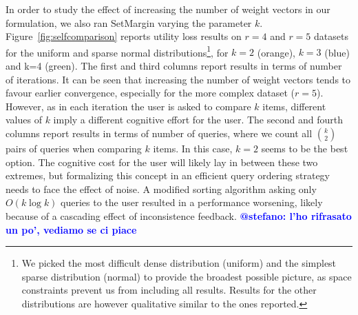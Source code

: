 \documentclass{article}
\renewcommand\[{\begin{equation}}
\renewcommand\]{\end{equation}}
\newcommand{\vecvar}[1]{\ensuremath{\boldsymbol{#1}}}
\newcommand{\vx}{\vecvar{x}}
\newcommand{\andrea}[1]{{\bf \textcolor{blue}{{\fbox{Andrea:} #1}}}}
\newcommand{\stefano}[1]{{\bf \textcolor{green}{{\fbox{Stefano:} #1}}}}
\begin{document}
In order to study the effect of increasing the number of weight
vectors in our formulation, we also ran {\sc SetMargin} varying the
parameter $k$. Figure~\ref{fig:selfcomparison} reports utility loss
results on $r=4$ and $r=5$ datasets for the uniform and sparse normal
distributions\footnote{We picked the most difficult dense distribution
  (uniform) and the simplest sparse distribution (normal) to provide
  the broadest possible picture, as space constraints prevent us from
  including all results. Results for the other distributions are
  however qualitative similar to the ones reported.}, for $k=2$
(orange), $k=3$ (blue) and k=4 (green). The first and third columns
report results in terms of number of iterations. It can be seen that
increasing the number of weight vectors tends to favour earlier
convergence, especially for the more complex dataset ($r=5$). However,
as in each iteration the user is asked to compare $k$ items, different
values of $k$ imply a different cognitive effort for the user. The
second and fourth columns report results in terms of number of
queries, where we count all $k \choose 2$ pairs of queries when
comparing $k$ items. In this case, $k=2$ seems to be the best
option. The cognitive cost for the user will likely lay in between
these two extremes, but formalizing this concept in an efficient query
ordering strategy needs to face the effect of noise.  A modified
sorting algorithm asking only $O(k\log k)$ queries to the user
resulted in a performance worsening, likely because of a cascading
effect of inconsistence feedback. \andrea{@stefano: l'ho rifrasato un
  po', vediamo se ci piace}


\end{document}
